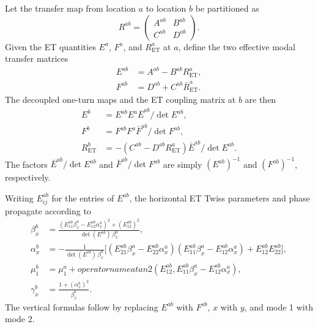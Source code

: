 \documentclass[11pt,a4paper]{article}
\begin{document}
Let the transfer map from location $a$ to location $b$ be partitioned as
\begin{equation}
 R^{ab}=
 \begin{pmatrix}
  A^{ab}&B^{ab}\\C^{ab}&D^{ab}
 \end{pmatrix}.
 \label{eq:Rab-blocks}
\end{equation}
Given the ET quantities $E^a$, $F^a$, and $R_{\mathrm{ET}}^a$ at $a$, define
the two effective modal transfer matrices
\begin{align}
 E^{ab}&=A^{ab}-B^{ab}R_{\mathrm{ET}}^a,
 \label{eq:Eab-definition}\\
 F^{ab}&=D^{ab}+C^{ab}\bar R_{\mathrm{ET}}^a.
 \label{eq:Fab-definition}
\end{align}
The decoupled one-turn maps and the ET coupling matrix at $b$ are then
\begin{align}
 E^b
 &=E^{ab}E^a\bar E^{ab}/\det E^{ab},
 \label{eq:E-propagation}\\
 F^b
 &=F^{ab}F^a\bar F^{ab}/\det F^{ab},
 \label{eq:F-propagation}\\
 R_{\mathrm{ET}}^b
 &=-\left(C^{ab}-D^{ab}R_{\mathrm{ET}}^a\right)
   \bar E^{ab}/\det E^{ab}.
 \label{eq:ret-propagation}
\end{align}
The factors $\bar E^{ab}/\det E^{ab}$ and
$\bar F^{ab}/\det F^{ab}$ are simply $(E^{ab})^{-1}$ and
$(F^{ab})^{-1}$, respectively.

Writing $E^{ab}_{ij}$ for the entries of $E^{ab}$, the horizontal ET Twiss
parameters and phase propagate according to
\begin{align}
 \beta_x^b
 &=\frac{
   \left(E^{ab}_{11}\beta_x^a-E^{ab}_{12}\alpha_x^a\right)^2
   +\left(E^{ab}_{12}\right)^2
  }{\det(E^{ab})\,\beta_x^a},
 \label{eq:et-beta-propagation}\\
 \alpha_x^b
 &=-\frac{1}{\det(E^{ab})\,\beta_x^a}
 \Big[
  \left(E^{ab}_{21}\beta_x^a-E^{ab}_{22}\alpha_x^a\right)
  \left(E^{ab}_{11}\beta_x^a-E^{ab}_{12}\alpha_x^a\right)
  +E^{ab}_{12}E^{ab}_{22}
 \Big],
 \label{eq:et-alpha-propagation}\\
 \mu_1^b
 &=\mu_1^a+operatorname{atan2}\!\left(
  E^{ab}_{12},
  E^{ab}_{11}\beta_x^a-E^{ab}_{12}\alpha_x^a
 \right),
 \label{eq:et-mu-propagation}\\
 \gamma_x^b&=\frac{1+(\alpha_x^b)^2}{\beta_x^b}.
 \label{eq:et-gamma-propagation}
\end{align}
The vertical formulas follow by replacing $E^{ab}$ with $F^{ab}$,
$x$ with $y$, and mode 1 with mode 2.
\end{document}
